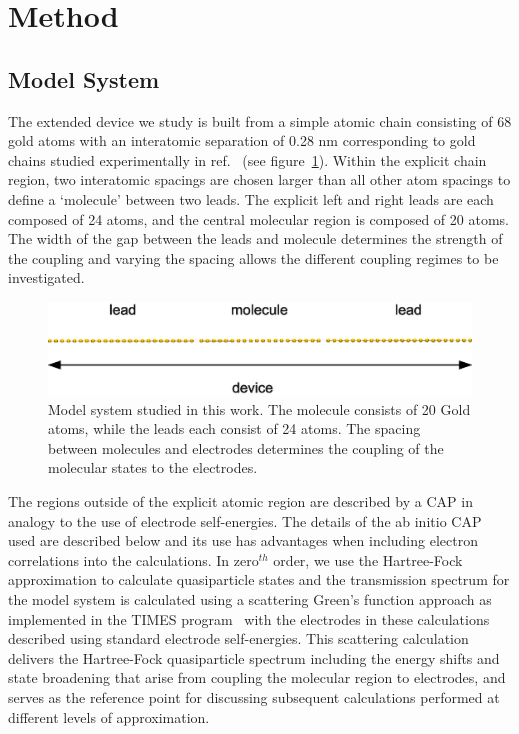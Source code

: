 \section{Method}
\label{sec:method}

\subsection{Model System}
\label{subsec:modelsystem}

The extended device we study is built from a simple atomic chain
consisting of 68 gold atoms with an interatomic separation of 0.28 nm
corresponding to gold chains studied experimentally in
ref.~\cite{nilius2002science} (see figure~\ref{fig:chaincapdevice}).
Within the explicit chain region, two interatomic spacings are chosen
larger than all other atom spacings to define a `molecule' between two
leads. The explicit left and right leads are each composed of 24 atoms,
and the central molecular region is composed of 20 atoms. The width of
the gap between the leads and molecule determines the strength of the
coupling and varying the spacing allows the different coupling regimes
to be investigated. 

\begin{figure}
	\begin{center}
		\includegraphics[width=0.9\linewidth]{figures/chaincapdevice}
	\end{center}
	\caption{Model system studied in this work. The molecule consists of
        20 Gold atoms, while the leads each consist of 24 atoms. The spacing
        between molecules and electrodes determines the coupling of the
        molecular states to the electrodes.}
	\label{fig:chaincapdevice}
\end{figure}

The regions outside of the explicit atomic region are described by a
\ac{CAP} in analogy to the use of electrode self-energies. The details of
the ab initio \ac{CAP} used are described below and its use has advantages
when including electron correlations into the calculations. In
zero$^{th}$ order, we use the Hartree-Fock approximation to calculate
quasiparticle states and the transmission spectrum for the model system
is calculated using a scattering Green's function approach as
implemented in the TIMES program~\cite{times} with the electrodes in
these calculations described using standard electrode self-energies.
This scattering calculation delivers the Hartree-Fock quasiparticle
spectrum including the energy shifts and state broadening that arise
from coupling the molecular region to electrodes, and serves as the
reference point for discussing subsequent calculations performed at
different levels of approximation.

